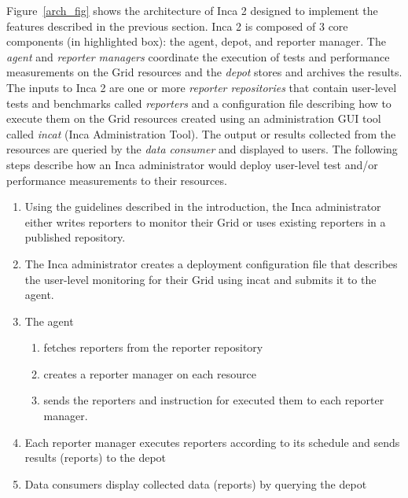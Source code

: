 \documentclass[times,10pt,twocolumn]{article}
\begin{document}
Figure~\ref{arch_fig} shows the architecture of Inca 2 designed to implement
the features described in the previous section.  Inca 2 is composed of 3 core
components (in highlighted box):  the agent, depot, and reporter manager.
The \textit{agent} and \textit{reporter managers} coordinate the execution of
tests and performance measurements on the Grid resources and the
\textit{depot} stores and archives the results.  The inputs to Inca 2 are one
or more \textit{reporter repositories} that contain user-level tests and
benchmarks called \textit{reporters} and a configuration file describing how
to execute them on the Grid resources created using an administration GUI tool
called \textit{incat} (Inca Administration Tool).  The output or results
collected from the resources are queried by the \textit{data consumer} and
displayed to users.  The following steps describe how an Inca administrator
would deploy user-level test and/or performance measurements to their
resources.

\begin{enumerate}

\item Using the guidelines described in the introduction, the Inca
administrator either writes reporters to monitor their Grid or uses existing
reporters in a published repository.

\item The Inca administrator creates a deployment configuration file that
describes the user-level monitoring for their Grid using incat and submits it
to the agent.

\item The agent
  \begin{enumerate}
    \item fetches reporters from the reporter repository
    \item creates a reporter manager on each resource
    \item sends the reporters and instruction for executed them to each reporter manager.
  \end{enumerate}

\item Each reporter manager executes reporters according to its schedule and
sends results (reports) to the depot

\item Data consumers display collected data (reports) by querying the depot
\end{enumerate}
\end{document}
